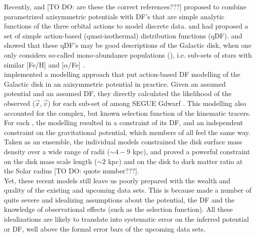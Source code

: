 Recently, \citet{bin12b} and \citet{bov13} [TO DO: are these the correct references???] proposed to combine parametrized axisymmetric potentials with DF's that are simple analytic functions of the three orbital actions to model discrete data. \citet{bin10} and \citet{bin11} had proposed a set of simple action-based (quasi-isothermal) distribution functions (qDF). \citet{tin13} and \citet{bov13} showed that these qDF's may be good descriptions of the Galactic disk, when one only considers so-called mono-abundance populations (\MAP), i.e. sub-sets of stars with similar [Fe/H] and [$\alpha$/Fe] \citep{bov12b,bov12c,bov12d}. \\

\citet{bov13} implemented a modelling approach that put action-based DF modelling of the Galactic disk in an axisymmetric potential in practice. Given an assumed potential and an assumed DF, they directly calculated the likelihood of the observed ($\vec{x},\vec{v}$) for each sub-set of \MAP among SEGUE Gdwarf \citep{yan09}. This modelling also accounted for the complex, but known selection function of the kinematic tracers.  For each \MAP, the modelling resulted in a constraint of its DF, and an independent constraint on the gravitational potential, which members of all \MAPs feel the same way. \\
Taken as an ensemble, the individual \MAP models constrained the disk surface mass density over a wide range of radii ($\sim 4-9$ kpc), and proved a powerful constraint on the disk mass scale length ($\sim 2$ kpc) and on the disk to dark matter ratio at the Solar radius [TO DO: quote number???]. \\

Yet, these recent models still leave us poorly prepared with the wealth and quality of the existing and upcoming data sets. This is because \citet{bov13} made a number of quite severe and idealizing assumptions about the potential, the DF and the knowledge of observational effects (such as the selection function). All these idealizations are likely to translate into systematic error on the inferred potential or DF, well above the formal error bars of the upcoming data sets. \\

